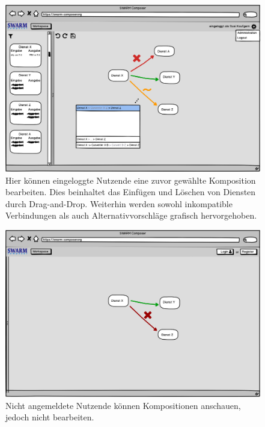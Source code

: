 \begin{figure}[h]
	\centering
	\includegraphics[width=\textwidth]{img/editor}
	\caption{
            Hier können eingeloggte Nutzende eine zuvor gewählte Komposition
            bearbeiten. Dies beinhaltet das Einfügen und Löschen von Diensten durch
            Drag-and-Drop. Weiterhin werden sowohl inkompatible Verbindungen
            als auch Alternativvorschläge grafisch hervorgehoben.
        }
	\label{fig:editor-web}
\end{figure}

\begin{figure}[h]
	\centering
	\includegraphics[width=\textwidth]{img/nichtangemeldet}
	\caption{
          Nicht angemeldete Nutzende können Kompositionen anschauen, jedoch nicht bearbeiten.
        }
	\label{fig:nichtangemeldet}
\end{figure}

